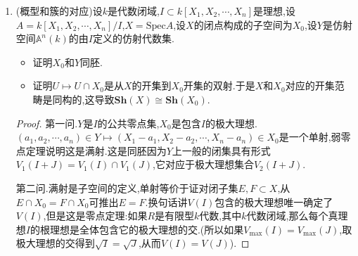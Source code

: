 \begin{enumerate}
	\item (概型和簇的对应)设$k$是代数闭域,$I\subset k[X_1,X_2,\cdots,X_n]$是理想,设$A=k[X_1,X_2,\cdots,X_n]/I$,$X=\mathrm{Spec}A$,设$X$的闭点构成的子空间为$X_0$,设$Y$是仿射空间$\mathbb{A}^n(k)$的由$I$定义的仿射代数集.
	\begin{itemize}
		\item 证明$X_0$和$Y$同胚.
		\item 证明$U\mapsto U\cap X_0$是从$X$的开集到$X_0$开集的双射.于是$X$和$X_0$对应的开集范畴是同构的,这导致$\textbf{Sh}(X)\cong\textbf{Sh}(X_0)$.
	\end{itemize}
	\begin{proof}
		
		第一问.$Y$是$I$的公共零点集,$X_0$是包含$I$的极大理想.$(a_1,a_2,\cdots,a_n)\in Y\mapsto(X_1-a_1,X_2-a_2,\cdots,X_n-a_n)\in X_0$是一个单射,弱零点定理说明这是满射.这是同胚因为$Y$上一般的闭集具有形式$V_1(I+J)=V_1(I)\cap V_1(J)$,它对应于极大理想集合$V_2(I+J)$.
		
		\qquad
		
		第二问.满射是子空间的定义,单射等价于证对闭子集$E,F\subset X$,从$E\cap X_0=F\cap X_0$可推出$E=F$.换句话讲$V(I)$包含的极大理想唯一确定了$V(I)$,但是这是零点定理:如果$R$是有限型$k$代数,其中$k$代数闭域,那么每个真理想$I$的根理想是全体包含它的极大理想的交.(所以如果$V_{\mathrm{max}}(I)=V_{\mathrm{max}}(J)$,取极大理想的交得到$\sqrt{I}=\sqrt{J}$,从而$V(I)=V(J)$).
		
		\qquad
		

\end{proof}
\end{enumerate}
